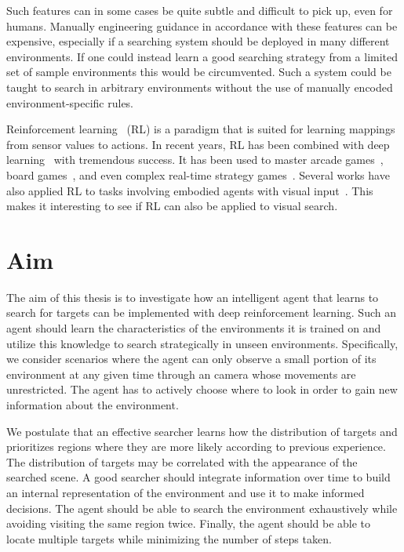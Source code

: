 Such features can in some cases be quite subtle and difficult to pick up, even for humans.
Manually engineering guidance in accordance with these features can be expensive,
especially if a searching system should be deployed in many different environments.
If one could instead learn a good searching strategy from a limited set of sample environments this would be circumvented.
Such a system could be taught to search in arbitrary environments without the use of manually encoded environment-specific rules.

Reinforcement learning~\cite{sutton_reinforcement_2018} (RL) is a paradigm that is suited for learning mappings from sensor values to actions.
In recent years, RL has been combined with deep learning~\cite{goodfellow_deep_2016} with tremendous success.
It has been used to master arcade games~\cite{mnih_human_2015}, board games~\cite{silver_alphago_2016}, and even complex real-time strategy games~\cite{vinyals_alphastar_2019}.
Several works have also applied RL to tasks involving embodied agents with visual input~\cite{minut_mahadevan_2001,mnih_attention_2014,zhu_target_2016,mirowski_navigate_2017}.
This makes it interesting to see if RL can also be applied to visual search.

\section{Aim}
\label{sec:aim}

The aim of this thesis is to investigate how an intelligent agent that learns to search for targets can be implemented with deep reinforcement learning.
Such an agent should learn the characteristics of the environments it is trained on and utilize this knowledge to search strategically in unseen environments.
Specifically, we consider scenarios where the agent can only observe a small portion of its environment at any given time through an camera whose movements are unrestricted.
The agent has to actively choose where to look in order to gain new information about the environment.

We postulate that an effective searcher learns how the distribution of targets and prioritizes regions where they are more likely according to previous experience.
The distribution of targets may be correlated with the appearance of the searched scene.
A good searcher should integrate information over time to build an internal representation of the environment and use it to make informed decisions.
The agent should be able to search the environment exhaustively while avoiding visiting the same region twice.
Finally, the agent should be able to locate multiple targets while minimizing the number of steps taken.

